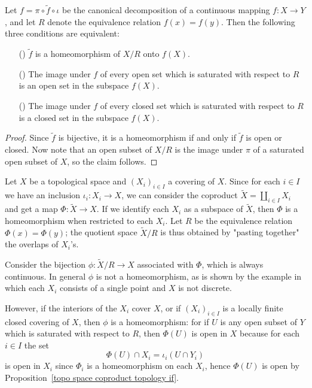 \begin{proposition}\label{topo space canonical decomposition homeomorphism iff}
Let $f=\pi\circ\tilde{f}\circ\iota$ be the canonical decomposition of a continuous mapping $f:X\to Y$, and let $R$ denote the equivalence relation $f(x)=f(y)$. Then the following three conditions are equivalent:
\begin{itemize}
\item[(\rmnum{1})] $\tilde{f}$ is a homeomorphism of $X/R$ onto $f(X)$.
\item[(\rmnum{2})] The image under $f$ of every open set which is saturated with respect to $R$ is an open set in the subspace $f(X)$.
\item[(\rmnum{3})] The image under $f$ of every closed set which is saturated with respect to $R$ is a closed set in the subspace $f(X)$.
\end{itemize}
\end{proposition}
\begin{proof}
Since $\tilde{f}$ is bijective, it is a homeomorphism if and only if $\tilde{f}$ is open or closed. Now note that an open subset of $X/R$ is the image under $\pi$ of a saturated open subset of $X$, so the claim follows.
\end{proof}
\begin{example}
Let $X$ be a topological space and $(X_i)_{i\in I}$ a covering of $X$. Since for each $i\in I$ we have an inclusion $\iota_i:X_i\to X$, we can consider the coproduct $\widetilde{X}=\coprod_{i\in I}X_i$ and get a map $\Phi:\widetilde{X}\to X$. If we identify each $X_i$ as a subspace of $\widetilde{X}$, then $\Phi$ is a homeomorphism when restricted to each $X_i$. Let $R$ be the equivalence relation $\Phi(x)=\Phi(y)$; the quotient space $\tilde{X}/R$ is thus obtained by "pasting together" the overlaps of $X_i$'s.\par
Consider the bijection $\phi:\widetilde{X}/R\to X$ associated with $\Phi$, which is always continuous. In general $\phi$ is not a homeomorphism, as is shown by the example in which each $X_i$ consists of a single point and $X$ is not discrete.\par
However, if the interiors of the $X_i$ cover $X$, or if $(X_i)_{i\in I}$ is a locally finite closed covering of $X$, then $\phi$ is a homeomorphism: for if $U$ is any open subset of $Y$ which is saturated with respect to $R$, then $\Phi(U)$ is open in $X$ because for each $i\in I$ the set
\[\Phi(U)\cap X_i=\iota_i(U\cap Y_i)\]
is open in $X_i$ since $\Phi_i$ is a homeomorphism on each $X_i$, hence $\Phi(U)$ is open by Proposition~\ref{topo space coproduct topology if}.
\end{example}
